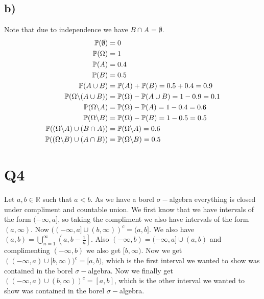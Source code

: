 \documentclass{article}
\begin{document}
\subsection*{b)}
Note that due to independence we have $B\cap A=\emptyset$.
\begin{align*}
\mathbb{P}(\emptyset)&=0\\
\mathbb{P}(\Omega)&=1\\
\mathbb{P}(A)&=0.4\\
\mathbb{P}(B)&=0.5\\
\mathbb{P}(A\cup B)&=\mathbb{P}(A)+\mathbb{P}(B)=0.5+0.4=0.9\\
\mathbb{P}(\Omega\symbol{92}(A\cup B))&=\mathbb{P}(\Omega)-\mathbb{P}(A\cup B)=1-0.9=0.1\\
\mathbb{P}(\Omega\symbol{92}A)&=\mathbb{P}(\Omega)-\mathbb{P}(A)=1-0.4=0.6\\
\mathbb{P}(\Omega\symbol{92}B)&=\mathbb{P}(\Omega)-\mathbb{P}(B)=1-0.5=0.5\\
\mathbb{P}((\Omega\symbol{92}A)\cup(B\cap A))&=\mathbb{P}(\Omega\symbol{92}A)=0.6\\
\mathbb{P}((\Omega\symbol{92}B)\cup(A\cap B))&=\mathbb{P}(\Omega\symbol{92}B)=0.5\\
\end{align*}
\section*{Q4}
Let $a,b\in\mathbb{R}$ such that $a<b$. As we have a borel $\sigma-$algebra everything is closed under compliment and countable union. We first know that we have intervals of the form $(-\infty,a]$, so taking the compliment we also have intervals of the form $(a,\infty)$. Now $((-\infty,a]\cup(b,\infty))^c=(a,b]$. We also have $(a,b)=\bigcup_{n=1}^{\infty}\left(a,b-\frac{1}{n}\right]$. Also $(-\infty,b)=(-\infty,a]\cup(a,b)$ and complimenting $(-\infty,b)$ we also get $[b,\infty)$. Now we get $((-\infty,a)\cup[b,\infty))^c=[a,b)$, which is the first interval we wanted to show was contained in the borel $\sigma-$algebra. Now we finally get $((-\infty,a)\cup(b,\infty))^c=[a,b]$, which is the other interval we wanted to show was contained in the borel $\sigma-$algebra.
\end{document}
